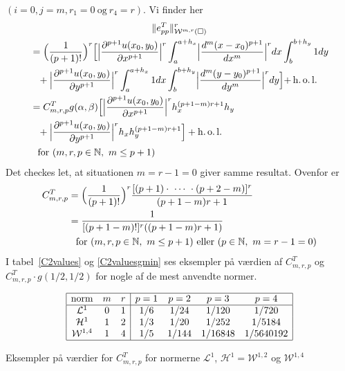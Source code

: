 $(i=0,j=m,r_1=0\ \text{og}\ r_4=r)$. Vi finder her
\begin{multline} \label{msnul}
  \|e_{pp}^T\|_{{\mathcal W}^{m,r}(\Box)}^r \\
\begin{split}
  &= \Bigl( \frac{1}{(p+1)!} \Bigr)^r
  \Bigl[ \Bigl| \frac{\partial^{p+1} u(x_0,y_0)}{\partial x^{p+1}} \Bigr|^r
  \int_a^{a+h_x} \Bigl| \frac{d^m(x-x_0)^{p+1}}{dx^m} \Bigr|^r dx
  \int_b^{b+h_y} 1dy \\
  &\phantom{=} + \Bigl| \frac{\partial^{p+1} u(x_0,y_0)}{\partial y^{p+1}} \Bigr|^r
  \int_a^{a+h_x} 1dx
  \int_b^{b+h_y} \Bigl| \frac{d^m(y-y_0)^{p+1}}{dy^m} \Bigr|^r dy
  \Bigl] + \operatorname{h.o.l.} \\
  &= C_{m,r,p}^T g(\alpha,\beta)
  \Bigl[ \Bigl| \frac{\partial^{p+1} u(x_0,y_0)}{\partial x^{p+1}} \Bigr|^r
  h_x^{(p+1-m)r+1} h_y \\
  &\phantom{=} + \Bigl| \frac{\partial^{p+1} u(x_0,y_0)}{\partial y^{p+1}} \Bigr|^r
  h_x h_y^{(p+1-m)r+1} \Bigr] + \operatorname{h.o.l.} \\
  &\phantom{=} \text{for $(m,r,p\in\mathbb{N}, \ m\leq p+1)$} \\
\end{split}
\end{multline}
Det checkes let, at situationen $m=r-1=0$ giver samme resultat.
Ovenfor er
\begin{equation} \label{msnulc}
\begin{split}
  C_{m,r,p}^T &= \Bigl( \frac{1}{(p+1)!} \Bigr)^r
  \frac{[(p+1)\cdot \ \cdots \ \cdot (p+2-m)]^r}{(p+1-m)r+1} \\
  &= \frac{1}{[(p+1-m)!]^r((p+1-m)r+1)} \\
  &\phantom{=} \text{for $(m,r,p\in\mathbb{N}, \ m\leq p+1)$ eller
  $(p\in\mathbb{N}, \ m=r-1=0)$} \\
\end{split}
\end{equation}
I tabel~\ref{C2values} og \ref{C2valuesgmin} ses eksempler på værdien
af $C_{m,r,p}^T$ og $C_{m,r,p}^T\cdot g(1/2,1/2)$ for
nogle af de mest anvendte normer.
\begin{table}[htb]
\begin{displaymath}
\begin{array}{|ccc|cccc|}
  \hline {\rm norm} & m & r & p=1 & p=2 & p=3 & p=4 \\
  \hline {\mathcal L}^1 & 0 & 1 & 1/6 & 1/24 & 1/120 & 1/720 \\
         {\mathcal H}^1 & 1 & 2 & 1/3 & 1/20 & 1/252 & 1/5184 \\
         {\mathcal W}^{1,4} & 1 & 4 & 1/5 & 1/144 &
         1/16848 & 1/5640192 \\ \hline
\end{array}
\end{displaymath}
\caption{Eksempler på værdier for $C_{m,r,p}^T$ for normerne
${\mathcal L}^1$, ${\mathcal H}^1 = {\mathcal W}^{1,2}$ og
${\mathcal W}^{1,4}$\label{C2values}}
\end{table}
